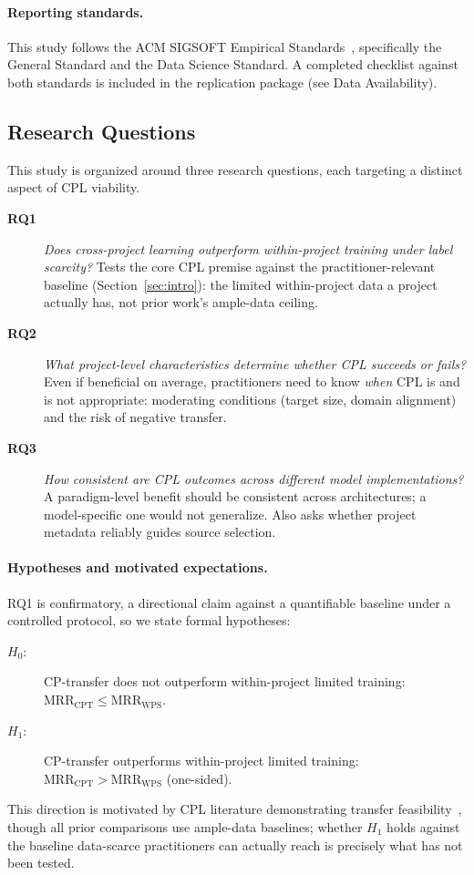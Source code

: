 \documentclass[a4paper,fleqn]{cas-dc}
\begin{document}
\paragraph{Reporting standards.} This study follows the ACM SIGSOFT Empirical
Standards~\citep{ralph2021empirical}, specifically the General Standard and the
Data Science Standard. A completed checklist against both standards is included
in the replication package (see Data Availability).

\subsection{Research Questions}

This study is organized around three research questions, each targeting a distinct
aspect of CPL viability.

\begin{description}
  \item[\textbf{RQ1}] \emph{Does cross-project learning outperform within-project
    training under label scarcity?} Tests the core CPL premise against the
    practitioner-relevant baseline (Section~\ref{sec:intro}): the limited
    within-project data a project actually has, not prior work's ample-data
    ceiling.

  \item[\textbf{RQ2}] \emph{What project-level characteristics determine whether CPL
    succeeds or fails?} Even if beneficial on average, practitioners need to
    know \emph{when} CPL is and is not appropriate: moderating conditions
    (target size, domain alignment) and the risk of negative transfer.

  \item[\textbf{RQ3}] \emph{How consistent are CPL outcomes across different model
    implementations?} A paradigm-level benefit should be consistent across
    architectures; a model-specific one would not generalize. Also asks
    whether project metadata reliably guides source selection.
\end{description}

\paragraph{Hypotheses and motivated expectations.}
RQ1 is confirmatory, a directional claim against a quantifiable baseline
under a controlled protocol, so we state formal hypotheses:
\begin{description}
  \item[$H_0$:] CP-transfer does not outperform within-project limited training:
        $\mathrm{MRR}_{\mathrm{CPT}} \leq \mathrm{MRR}_{\mathrm{WPS}}$.
  \item[$H_1$:] CP-transfer outperforms within-project limited training:
        $\mathrm{MRR}_{\mathrm{CPT}} > \mathrm{MRR}_{\mathrm{WPS}}$ (one-sided).
\end{description}
This direction is motivated by CPL literature demonstrating transfer
feasibility~\citep{huo2019deep,chakraborty2025blaze,zhu2020cooba}, though all
prior comparisons use ample-data baselines; whether $H_1$ holds against the
baseline data-scarce practitioners can actually reach is precisely what has
not been tested.
\end{document}
